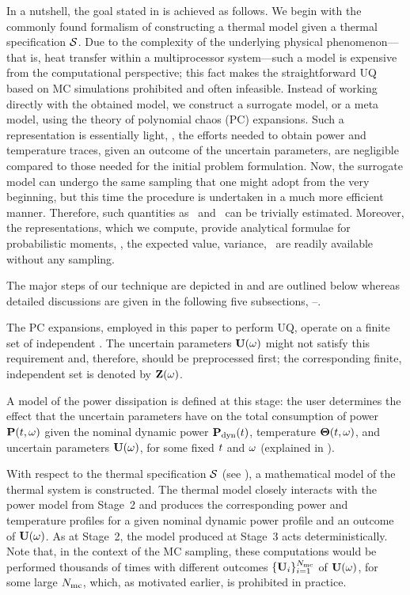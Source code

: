 In a nutshell, the goal stated in  is achieved as follows. We begin with the commonly found formalism of constructing a thermal model given a thermal specification $\mathcal{S}$. Due to the complexity of the underlying physical phenomenon---that is, heat transfer within a multiprocessor system---such a model is expensive from the computational perspective; this fact makes the straightforward UQ based on MC simulations prohibited and often infeasible. Instead of working directly with the obtained model, we construct a surrogate model, or a meta model, using the theory of polynomial chaos (PC) expansions. Such a representation is essentially light, \ie, the efforts needed to obtain power and temperature traces, given an outcome of the uncertain parameters, are negligible compared to those needed for the initial problem formulation. Now, the surrogate model can undergo the same sampling that one might adopt from the very beginning, but this time the procedure is undertaken in a much more efficient manner. Therefore, such quantities as \cdfs\ and \pdfs\ can be trivially estimated. Moreover, the representations, which we compute, provide analytical formulae for probabilistic moments, \ie, the expected value, variance, \etc\ are readily available without any sampling.

The major steps of our technique are depicted in  and are outlined below whereas detailed discussions are given in the following five subsections, --.

 The PC expansions, employed in this paper to perform UQ, operate on a finite set of independent \rvs. The uncertain parameters $\mathbf{U}(\omega)$ might not satisfy this requirement and, therefore, should be preprocessed first; the corresponding finite, independent set is denoted by $\mathbf{Z}(\omega)$.

 A model of the power dissipation is defined at this stage: the user determines the effect that the uncertain parameters have on the total consumption of power $\mathbf{P}(t, \omega)$ given the nominal dynamic power $\mathbf{P}_{\text{dyn}}(t)$, temperature ${\boldsymbol\Theta}(t, \omega)$, and uncertain parameters $\mathbf{U}(\omega)$, for some fixed $t$ and $\omega$ (explained in ).

 With respect to the thermal specification $\mathcal{S}$ (see ), a mathematical model of the thermal system is constructed. The thermal model closely interacts with the power model from Stage~2 and produces the corresponding power and temperature profiles for a given nominal dynamic power profile and an outcome of $\mathbf{U}(\omega)$. As at Stage~2, the model produced at Stage~3 acts deterministically. Note that, in the context of the MC sampling, these computations would be performed thousands of times with different outcomes $\{ \mathbf{U}_i \}_{i = 1}^{N_\text{mc}}$ of $\mathbf{U}(\omega)$, for some large $N_\text{mc}$, which, as motivated earlier, is prohibited in practice.


